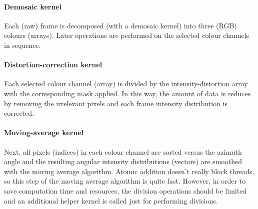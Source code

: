 \documentclass[12pt,dvips]{elsarticle}
\begin{document}
\paragraph{Demosaic kernel} Each (raw) frame is decomposed (with a demosaic kernel) into three (RGB) colours (arrays).
Later operations are performed on the selected colour channels in sequence.

\paragraph{Distortion-correction kernel} Each selected colour channel (array) is divided by the intensity-distortion array
with the corresponding mask applied. In this way, the amount of data is reduces by removing the irrelevant pixels and
each frame intensity distribution is corrected.

\paragraph{Moving-average kernel} Next, all pixels (indices) in each colour channel are sorted versus the azimuth angle
and the resulting angular intensity distributions (vectors) are smoothed with the moving average algorithm. Atomic
addition doesn't really block threads, so this step of the moving average algorithm is quite fast. However, in order to
save computation time and resources, the division operations should be limited and an additional helper kernel is called
just for performing divisions.
\end{document}
